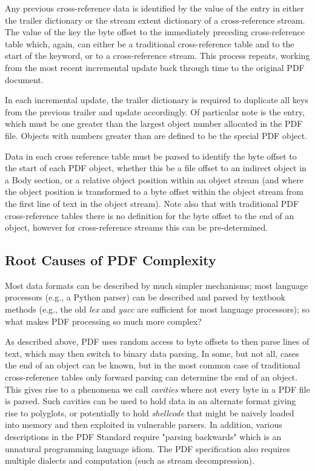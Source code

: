 Any previous cross-reference data is identified by the value of the  entry in either
the trailer dictionary or the stream extent dictionary of a cross-reference stream. The
value of the  key the byte offset to the immediately
preceding cross-reference table which, again, can either be a traditional
cross-reference table and to the start of the  keyword, or to a
cross-reference stream. This process repeats, working from the most recent incremental
update back through time to the original PDF document.

In each incremental update, the trailer dictionary is required to duplicate all keys from the previous
trailer and update accordingly. Of particular note is the  entry, which must be
one greater than the largest object number allocated in the PDF file. Objects with numbers greater
than  are defined to be the special PDF  object.

Data in each cross reference table must be parsed to
identify the byte offset to the start of each PDF object, whether this be a file offset to an indirect object in a Body section, or a relative object position within an object stream (and where the object position is transformed to a byte offset within the object stream from the first line of text in the object stream). Note also that with traditional PDF cross-reference tables there is no definition for the byte offset to the end of an object, however for cross-reference streams this can be pre-determined.


\subsection{Root Causes of PDF Complexity}
\label{sec:rootcause}

Most data formats can be described by much simpler mechanisms;
most language processors (e.g., a Python parser) can be described and parsed by
textbook methods (e.g., the old \emph{lex} and \emph{yacc} are sufficient for
most language processors);
so what makes PDF processing so much more complex?

As described above, PDF uses random access to byte offsets to then parse lines of text,
which may then switch to binary data parsing. 
In some, but not all, cases the end of an object can be known, but in the most common case 
of traditional cross-reference tables only forward parsing can determine the end of an object. 
This gives rise to a phenomena we call \emph{cavities} where not every byte in a PDF file is parsed.
Such cavities can be used to hold data in an alternate format giving rise to polyglots, or potentially
to hold \emph{shellcode} that might be naively loaded into memory and then exploited 
in vulnerable parsers.
In addition, various descriptions in the PDF Standard require "parsing backwards" which is 
an unnatural programming language idiom. The PDF specification also requires multiple
dialects and computation (such as stream decompression).


